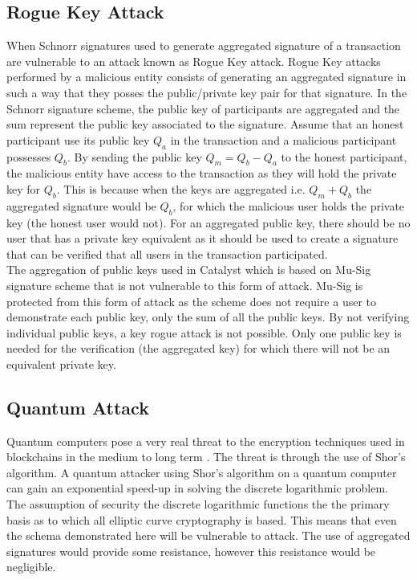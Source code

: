 \subsection{Rogue Key Attack}

When Schnorr signatures used to generate aggregated signature of a transaction are vulnerable to an attack known as Rogue Key attack. Rogue Key attacks performed by a malicious entity consists of generating an aggregated signature in such a way that they posses the public/private key pair for that signature. In the Schnorr signature scheme, the public key of participants are aggregated and the sum represent the public key associated to the signature. Assume that an honest participant use its public key $Q_a$ in the transaction and a malicious participant possesses $Q_b$. By sending the public key $Q_m = Q_b -  Q_a$ to the honest participant, the malicious entity have access to the transaction as they will hold the private key for $Q_b$. This is because when the keys are aggregated i.e. $Q_m + Q_b$ the aggregated signature would be $Q_b$, for which the malicious user holds the private key (the honest user would not). For an aggregated public key, there should be no user that has a private key equivalent as it should be used to create a signature that can be verified that all users in the transaction participated. \\ 	

The aggregation of public keys used in Catalyst which is based on Mu-Sig \cite{musig} signature scheme that is not vulnerable to this form of attack. Mu-Sig is protected from this form of attack as the scheme does not require a user to demonstrate each public key, only the sum of all the public keys. By not verifying individual public keys, a key rogue attack is not possible. Only one public key is needed for the verification (the aggregated key) for which there will not be an equivalent private key.

\subsection{Quantum Attack}

Quantum computers pose a very real threat to the encryption techniques used in blockchains in the medium to long term \cite{agarwal} \cite{kearney}. The threat is through the use of Shor's algorithm. A quantum attacker using Shor's algorithm on a quantum computer can gain an exponential speed-up in solving the discrete logarithmic problem. The assumption of security the discrete logarithmic functions the the primary basis as to which all elliptic curve cryptography is based. This means that even the schema demonstrated here will be vulnerable to attack. The use of aggregated signatures would provide some resistance, however this resistance would be negligible. \\

